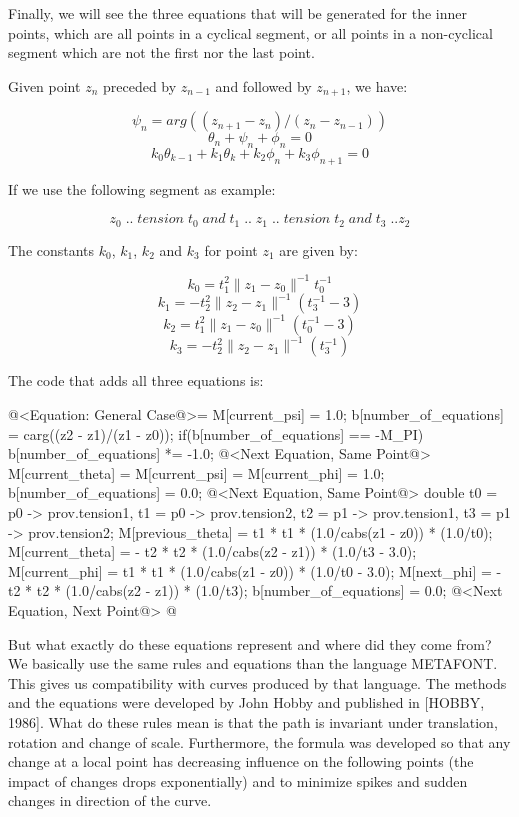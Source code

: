 Finally, we will see the three equations that will be generated for
the inner points, which are all points in a cyclical segment, or all
points in a non-cyclical segment which are not the first nor the last
point.

Given point $z_n$ preceded by $z_{n-1}$ and followed by $z_{n+1}$,
we have:

$$
\psi_n = arg((z_{n+1}-z_n)/(z_n-z_{n-1}))
$$
$$
\theta_n + \psi_n + \phi_n = 0
$$
$$
k_0\theta_{k-1} + k_1\theta_k + k_2\phi_n + k_3\phi_{n+1} = 0
$$

If we use the following segment as example:

$$
z_0\; ..\; tension\; t_0\; and\; t_1\; ..\; z_1\; ..\; tension\; t_2\; and\; t_3
\; .. z_2
$$

The constants $k_0$, $k_1$, $k_2$ and $k_3$ for point $z_1$ are given
by:

$$
k_0 = t_1^2\|z_1-z_0\|^{-1}t_0^{-1}
$$
$$
k_1 = - t_2^2\|z_2-z_1\|^{-1}(t_3^{-1}-3)
$$
$$
k_2 = t_1^2\|z_1-z_0\|^{-1}(t_0^{-1} - 3)
$$
$$
k_3 = - t_2^2\|z_2-z_1\|^{-1}(t_3^{-1})
$$

The code that adds all three equations is:

\iniciocodigo
@<Equation: General Case@>=
M[current_psi] = 1.0;
b[number_of_equations] = carg((z2 - z1)/(z1 - z0));
if(b[number_of_equations] == -M_PI)
  b[number_of_equations] *= -1.0;
@<Next Equation, Same Point@>
M[current_theta] = M[current_psi] = M[current_phi] = 1.0;
b[number_of_equations] = 0.0;
@<Next Equation, Same Point@>
{
  double t0 = p0 -> prov.tension1, t1 = p0 -> prov.tension2,
         t2 = p1 -> prov.tension1, t3 = p1 -> prov.tension2;
  M[previous_theta] = t1 * t1 * (1.0/cabs(z1 - z0)) * (1.0/t0);
  M[current_theta] = - t2 * t2 * (1.0/cabs(z2 - z1)) * (1.0/t3 - 3.0);
  M[current_phi] = t1 * t1 * (1.0/cabs(z1 - z0)) * (1.0/t0 - 3.0);
  M[next_phi] = - t2 * t2 * (1.0/cabs(z2 - z1)) * (1.0/t3);
  b[number_of_equations] = 0.0;
  @<Next Equation, Next Point@>
}
@
\fimcodigo

But what exactly do these equations represent and where did they come
from? We basically use the same rules and equations than the language
METAFONT. This gives us compatibility with curves produced by that
language. The methods and the equations were developed by John Hobby
and published in [HOBBY, 1986]. What do these rules mean is that the
path is invariant under translation, rotation and change of
scale. Furthermore, the formula was developed so that any change at a
local point has decreasing influence on the following points (the
impact of changes drops exponentially) and to minimize spikes and
sudden changes in direction of the curve.

